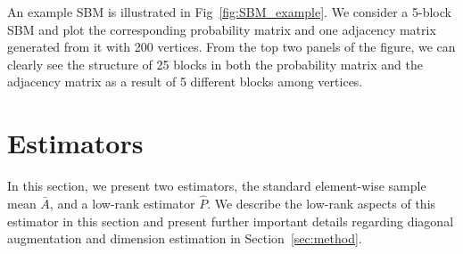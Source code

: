 \documentclass[10pt,letterpaper]{article}
\begin{document}
An example SBM is illustrated in Fig~\ref{fig:SBM_example}.
We consider a 5-block SBM and plot the corresponding probability matrix and one adjacency matrix generated from it with 200 vertices. From the top two panels of the figure, we can clearly see the structure of 25 blocks in both the probability matrix and the adjacency matrix as a result of 5 different blocks among vertices.



\section{Estimators}
\label{sec:estimator}

In this section, we present two estimators, the standard element-wise sample mean $\bar{A}$, and a low-rank estimator $\hat{P}$.
We describe the low-rank aspects of this estimator in this section and present further important details regarding diagonal augmentation and dimension estimation in Section~\ref{sec:method}.
\end{document}
